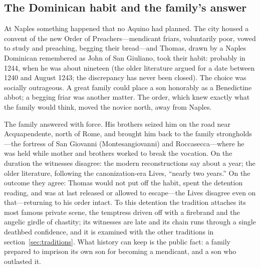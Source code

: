 \subsection{The Dominican habit and the family's answer}

At Naples something happened that no Aquino had planned. The city housed a
convent of the new Order of Preachers---mendicant friars, voluntarily
poor, vowed to study and preaching, begging their bread---and Thomas,
drawn by a Naples Dominican remembered as John of San Giuliano, took their
habit: probably in 1244, when he was about nineteen (the older literature
argued for a date between 1240 and August 1243; the discrepancy has never
been closed). The choice was socially outrageous. A great family could
place a son honorably as a Benedictine abbot; a begging friar was another
matter. The order, which knew exactly what the family would think, moved
the novice north, away from Naples.

The family answered with force. His brothers seized him on the road near
Acquapendente, north of Rome, and brought him back to the family
strongholds---the fortress of San Giovanni (Montesangiovanni) and
Roccasecca---where he was held while mother and brothers worked to break
the vocation. On the duration the witnesses disagree: the modern
reconstructions say about a year; the older literature, following the
canonization-era Lives, ``nearly two years.'' On the outcome they agree:
Thomas would not put off the habit, spent the detention reading, and was
at last released or allowed to escape---the Lives disagree even on
that---returning to his order intact. To this detention the tradition
attaches its most famous private scene, the temptress driven off with a
firebrand and the angelic girdle of chastity; its witnesses are late and
its chain runs through a single deathbed confidence, and it is examined
with the other traditions in section~\ref{sec:traditions}. What history
can keep is the public fact: a family prepared to imprison its own son
for becoming a mendicant, and a son who outlasted it.

